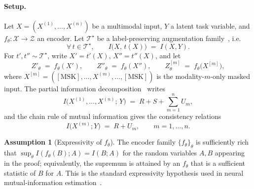 \documentclass{article}
\theoremstyle{plain}
\theoremstyle{definition}
\newtheorem{assumption}{Assumption}
\begin{document}
\paragraph{Setup.} Let $X = (X^{(1)}, \ldots, X^{(n)})$ be a multimodal input, $Y$ a latent task variable, and $f_\theta : \mathcal{X} \to \mathcal{Z}$ an encoder. Let $\mathcal{T}^\star$ be a label-preserving augmentation family~\citep{tian2020what}, i.e.\
\begin{equation}\label{eq:assumption1}
  \forall\, t \in \mathcal{T}^\star, \qquad I\bigl(X,\, t(X)\bigr) \;=\; I(X, Y).
\end{equation}
For $t', t'' \sim \mathcal{T}^\star$, write $X' = t'(X)$, $X'' = t''(X)$, and let
\begin{equation}\label{eq:joint-and-masked-encodings}
  Z'_{\theta} \;=\; f_\theta(X'),
  \qquad
  Z''_{\theta} \;=\; f_\theta(X''),
  \qquad
  Z^{[m]}_{\theta} \;=\; f_\theta\bigl(X^{[m]}\bigr),
\end{equation}
where $X^{[m]} = ([\mathrm{MSK}], \ldots, X^{(m)}, \ldots, [\mathrm{MSK}])$ is the modality-$m$-only masked input. The partial information decomposition~\citep{williams2010nonnegative,bertschinger2014quantifying} writes
\begin{equation}\label{eq:pid}
  I\bigl(X^{(1)}, \ldots, X^{(n)};\, Y\bigr) \;=\; R + S + \sum_{m=1}^{n} U_m,
\end{equation}
and the chain rule of mutual information gives the consistency relations~\citep{bertschinger2014quantifying}
\begin{equation}\label{eq:pid-consistency}
  I\bigl(X^{(m)}; Y\bigr) \;=\; R + U_m, \qquad m = 1, \ldots, n.
\end{equation}

\begin{assumption}[Expressivity of $f_\theta$]\label{ass:expressivity}
The encoder family $\{f_\theta\}_\theta$ is sufficiently rich that $\sup_\theta I(f_\theta(B); A) = I(B; A)$ for the random variables $A, B$ appearing in the proof; equivalently, the supremum is attained by an $f_\theta$ that is a sufficient statistic of $B$ for $A$. This is the standard expressivity hypothesis used in neural mutual-information estimation~\citep{oord2018representation,tian2020contrastive}.
\end{assumption}
\end{document}
